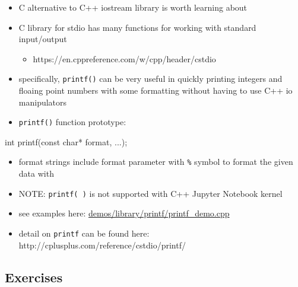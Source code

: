 \documentclass[11pt]{article}
\providecommand{\tightlist}{%
      \setlength{\itemsep}{0pt}\setlength{\parskip}{0pt}}
\newenvironment{Shaded}{}{}
\newcommand{\DataTypeTok}[1]{\textcolor[rgb]{0.56,0.13,0.00}{{#1}}}
\newcommand{\NormalTok}[1]{{#1}}
\newcommand{\OperatorTok}[1]{\textcolor[rgb]{0.40,0.40,0.40}{{#1}}}
\newcommand{\AttributeTok}[1]{\textcolor[rgb]{0.49,0.56,0.16}{{#1}}}
\begin{document}
\begin{itemize}
\tightlist
\item
  C alternative to C++ iostream library is worth learning about
\item
  C library for stdio has many functions for working with standard
  input/output

  \begin{itemize}
  \tightlist
  \item
    https://en.cppreference.com/w/cpp/header/cstdio
  \end{itemize}
\item
  specifically, \texttt{printf()} can be very useful in quickly printing
  integers and floaing point numbers with some formatting without having
  to use C++ io manipulators
\item
  \texttt{printf()} function prototype:
\end{itemize}

\begin{Shaded}
\begin{Highlighting}[]
\DataTypeTok{int}\NormalTok{ printf}\OperatorTok{(}\AttributeTok{const} \DataTypeTok{char}\OperatorTok{*}\NormalTok{ format}\OperatorTok{,} \OperatorTok{...);}
\end{Highlighting}
\end{Shaded}

\begin{itemize}
\tightlist
\item
  format strings include format parameter with \texttt{\%} symbol to
  format the given data with
\item
  NOTE: \texttt{printf(\ )} is not supported with C++ Jupyter Notebook
  kernel
\item
  see examples here: \url{demos/library/printf/printf_demo.cpp}
\item
  detail on \texttt{printf} can be found here:
  http://cplusplus.com/reference/cstdio/printf/
\end{itemize}

    \hypertarget{exercises}{%
\subsection{Exercises}\label{exercises}}
\end{document}

